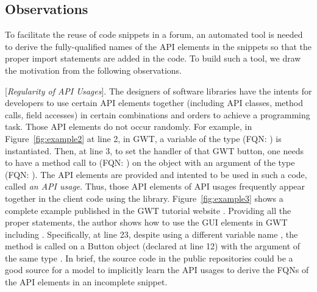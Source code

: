 
\subsection{Observations}
\label{sec:obs}

To facilitate the reuse of code snippets in a forum, an automated tool
is needed to derive the fully-qualified names of the API elements in
the snippets so that the proper import statements are added in the
code. To build such a tool, we draw the motivation from the following
observations.

\vspace{2pt}
 [{\em Regularity of API Usages}]. The
designers of software libraries have the intents for developers to use
certain API elements together (including API classes, method calls,
field accesses) in certain combinations and orders to achieve a
programming task. Those API elements do not occur randomly. For
example, in Figure~\ref{fig:example2} at line 2, in GWT, a variable of
the type  (FQN:
) is instantiated. Then, at
line 3, to set the handler of that GWT button, one needs to have a
method call to  (FQN:
) on
the  object with an argument of the type
 (FQN:
).  The
API elements are provided and intented to be used in such a code,
called {\em an API usage}. Thus, those API elements of API usages
frequently appear together in the client code using the
library. Figure~\ref{fig:example3} shows a complete example published
in the GWT tutorial website . Providing all the
proper  statements, the author shows how to use the GUI
elements in GWT including . Specifically, at line 23,
despite using a different variable name , the
method  is called on a Button object (declared
at line 12) with the argument of the same type . In
brief, the source code in the public repositories could be a good
source for a model to implicitly learn the API usages to derive the
FQNs of the API elements in an incomplete snippet.




